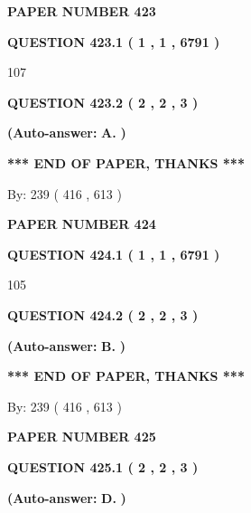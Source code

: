 \documentclass[12pt]{article}
\begin{document}
   
\newpage 
\setcounter{page}{ 
   423001 } 
   
   
 {\textbf{ \Large{ PAPER NUMBER  423  }}}
   
   
   
   
  
  
{\textbf{\large{QUESTION
423.1 
 ( 1 , 1 , 6791 )
}}}

107
  
  
{\textbf{\large{QUESTION
423.2 
 ( 2 , 2 , 3 )
}}}
 
 
{\textbf{(Auto-answer:}}
{\textbf{\large{
A.}}}
{\textbf{)}}
 
 
   
   
   
   
\vspace{1.0in} 
{\textbf{\large{ *** END OF PAPER, THANKS *** }}} 
   
   
\hspace{1.0in} By: 
 239 ( 416 ,  613 )
   
   
   
   
\newpage 
\setcounter{page}{ 
   424001 } 
   
   
 {\textbf{ \Large{ PAPER NUMBER  424  }}}
   
   
   
   
  
  
{\textbf{\large{QUESTION
424.1 
 ( 1 , 1 , 6791 )
}}}

105
  
  
{\textbf{\large{QUESTION
424.2 
 ( 2 , 2 , 3 )
}}}
 
 
{\textbf{(Auto-answer:}}
{\textbf{\large{
B.}}}
{\textbf{)}}
 
 
   
   
   
   
\vspace{1.0in} 
{\textbf{\large{ *** END OF PAPER, THANKS *** }}} 
   
   
\hspace{1.0in} By: 
 239 ( 416 ,  613 )
   
   
   
   
\newpage 
\setcounter{page}{ 
   425001 } 
   
   
 {\textbf{ \Large{ PAPER NUMBER  425  }}}
   
   
   
   
  
  
{\textbf{\large{QUESTION
425.1 
 ( 2 , 2 , 3 )
}}}
 
 
{\textbf{(Auto-answer:}}
{\textbf{\large{
D.}}}
{\textbf{)}}
 
 
  
\end{document}
